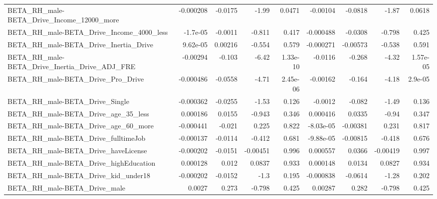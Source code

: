 \begin{tabular}{lrrrrrrrr}
BETA\_RH\_male-BETA\_Drive\_Income\_12000\_more          &   -0.000208 &      -0.0175 &    -1.99 &   0.0471 &   -0.00104 &     -0.0818 &        -1.87 &        0.0618 \\
BETA\_RH\_male-BETA\_Drive\_Income\_4000\_less           &    -1.7e-05 &      -0.0011 &   -0.811 &    0.417 &  -0.000488 &     -0.0308 &       -0.798 &         0.425 \\
BETA\_RH\_male-BETA\_Drive\_Inertia\_Drive              &    9.62e-05 &      0.00216 &   -0.554 &    0.579 &  -0.000271 &    -0.00573 &       -0.538 &         0.591 \\
BETA\_RH\_male-BETA\_Drive\_Inertia\_Drive\_ADJ\_FRE      &    -0.00294 &       -0.103 &    -6.42 & 1.33e-10 &    -0.0116 &      -0.268 &        -4.32 &      1.57e-05 \\
BETA\_RH\_male-BETA\_Drive\_Pro\_Drive                  &   -0.000486 &      -0.0558 &    -4.71 & 2.45e-06 &   -0.00162 &      -0.164 &        -4.18 &       2.9e-05 \\
BETA\_RH\_male-BETA\_Drive\_Single                     &   -0.000362 &      -0.0255 &    -1.53 &    0.126 &    -0.0012 &      -0.082 &        -1.49 &         0.136 \\
BETA\_RH\_male-BETA\_Drive\_age\_35\_less                &    0.000186 &       0.0155 &   -0.943 &    0.346 &   0.000416 &      0.0335 &        -0.94 &         0.347 \\
BETA\_RH\_male-BETA\_Drive\_age\_60\_more                &   -0.000441 &       -0.021 &    0.225 &    0.822 &  -8.03e-05 &    -0.00381 &        0.231 &         0.817 \\
BETA\_RH\_male-BETA\_Drive\_fulltimeJob                &   -0.000137 &      -0.0114 &   -0.412 &    0.681 &  -9.88e-05 &    -0.00815 &       -0.418 &         0.676 \\
BETA\_RH\_male-BETA\_Drive\_haveLicense                &   -0.000202 &      -0.0151 & -0.00451 &    0.996 &   0.000557 &      0.0366 &     -0.00419 &         0.997 \\
BETA\_RH\_male-BETA\_Drive\_highEducation              &    0.000128 &        0.012 &   0.0837 &    0.933 &   0.000148 &      0.0134 &       0.0827 &         0.934 \\
BETA\_RH\_male-BETA\_Drive\_kid\_under18                &   -0.000202 &      -0.0152 &     -1.3 &    0.195 &  -0.000838 &     -0.0614 &        -1.28 &         0.202 \\
BETA\_RH\_male-BETA\_Drive\_male                       &      0.0027 &        0.273 &   -0.798 &    0.425 &    0.00287 &       0.282 &       -0.798 &         0.425 \\

\end{tabular}
